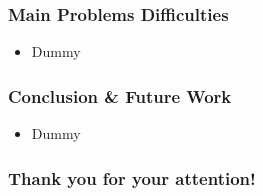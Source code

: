 \documentclass{beamer}
\begin{document}
\begin{frame}
\frametitle{Main Problems Difficulties}
\begin{itemize}
 \item Dummy
\end{itemize}
\end{frame}


\begin{frame}
\frametitle{Conclusion \& Future Work}
\begin{itemize}
 \item Dummy
\end{itemize}
\end{frame}




\begin{frame}
\begin{center}
\frametitle{Thank you for your attention!}
\end{center}
\end{frame}
\end{document}
